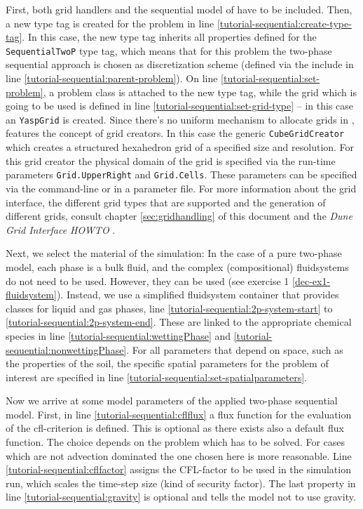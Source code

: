 First, both \Dune  grid handlers and the sequential model of \Dumux
have to be included. Then, a new type tag is created for the problem
in line \ref{tutorial-sequential:create-type-tag}.  In this case, the
new type tag inherits all properties defined for the \texttt{SequentialTwoP}
type tag, which means that for this problem the two-phase sequential approach
is chosen as discretization scheme (defined via the include in line
\ref{tutorial-sequential:parent-problem}). On line \ref{tutorial-sequential:set-problem},
a problem class is attached to the new type tag, while the grid which
is going to be used is defined in line \ref{tutorial-sequential:set-grid-type} --
in this case an \texttt{YaspGrid} is created. Since there's no uniform mechanism to
allocate grids in \Dune, \Dumux features the concept of grid creators.
In this case the generic \texttt{CubeGridCreator} which creates a
structured hexahedron grid of a specified size and resolution. For
this grid creator the  physical domain of the grid is specified via the
run-time parameters \texttt{Grid.UpperRight} and
\texttt{Grid.Cells}. These parameters can be specified via
the command-line or in a parameter file.
For more information about the \Dune grid interface, the different grid types
that are supported and the generation of different grids, consult chapter \ref{sec:gridhandling} of this document and
the \textit{Dune Grid Interface HOWTO} \cite{DUNE-HP}.

Next, we select the material of the simulation: In the case of a pure two-phase
model, each phase is a bulk fluid, and the complex (compositional) fluidsystems
do not need to be used. However, they can be used (see exercise 1 \ref{dec-ex1-fluidsystem}).
Instead, we use a simplified fluidsystem container that provides classes
for liquid and gas phases, line \ref{tutorial-sequential:2p-system-start} to
\ref{tutorial-sequential:2p-system-end}. These are linked to the appropriate
chemical species in line \ref{tutorial-sequential:wettingPhase} and
\ref{tutorial-sequential:nonwettingPhase}. For all parameters that depend
on space, such as the properties of the soil, the specific spatial parameters
for the problem of interest are specified in line
\ref{tutorial-sequential:set-spatialparameters}.

Now we arrive at some model parameters of the applied two-phase sequential
model. First, in line  \ref{tutorial-sequential:cflflux} a flux function for the
evaluation of the cfl-criterion is defined. This is optional as there exists also
a default flux function. The choice depends on the problem which has to be solved.
For cases which are not advection dominated the one chosen here is more reasonable.
Line \ref{tutorial-sequential:cflfactor} assigns the CFL-factor to be used in the
simulation run, which scales the time-step size (kind of security factor). The last
property in line \ref{tutorial-sequential:gravity}
is optional and tells the model not to use gravity.


